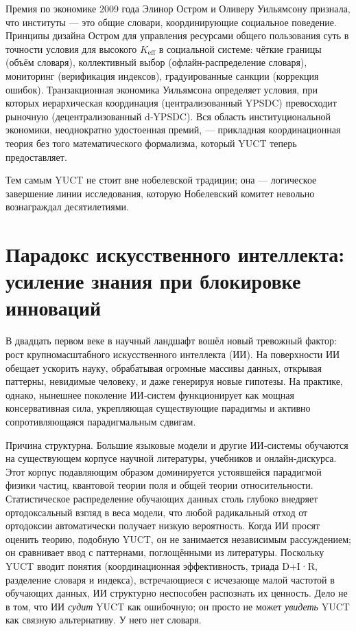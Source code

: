 \documentclass[12pt,a4paper]{article}
\begin{document}
	Премия по экономике 2009 года Элинор Остром и Оливеру Уильямсону признала, что институты — это общие словари, координирующие социальное поведение. Принципы дизайна Остром для управления ресурсами общего пользования суть в точности условия для высокого \(K_{\mathrm{eff}}\) в социальной системе: чёткие границы (объём словаря), коллективный выбор (офлайн-распределение словаря), мониторинг (верификация индексов), градуированные санкции (коррекция ошибок). Транзакционная экономика Уильямсона определяет условия, при которых иерархическая координация (централизованный YPSDC) превосходит рыночную (децентрализованный d‑YPSDC). Вся область институциональной экономики, неоднократно удостоенная премий, — прикладная координационная теория без того математического формализма, который YUCT теперь предоставляет.
	
	Тем самым YUCT не стоит вне нобелевской традиции; она — логическое завершение линии исследования, которую Нобелевский комитет невольно вознаграждал десятилетиями.
	
	\section{Парадокс искусственного интеллекта: усиление знания при блокировке инноваций}
	
	В двадцать первом веке в научный ландшафт вошёл новый тревожный фактор: рост крупномасштабного искусственного интеллекта (ИИ). На поверхности ИИ обещает ускорить науку, обрабатывая огромные массивы данных, открывая паттерны, невидимые человеку, и даже генерируя новые гипотезы. На практике, однако, нынешнее поколение ИИ‑систем функционирует как мощная консервативная сила, укрепляющая существующие парадигмы и активно сопротивляющаяся парадигмальным сдвигам.
	
	Причина структурна. Большие языковые модели и другие ИИ‑системы обучаются на существующем корпусе научной литературы, учебников и онлайн‑дискурса. Этот корпус подавляющим образом доминируется устоявшейся парадигмой физики частиц, квантовой теории поля и общей теории относительности. Статистическое распределение обучающих данных столь глубоко внедряет ортодоксальный взгляд в веса модели, что любой радикальный отход от ортодоксии автоматически получает низкую вероятность. Когда ИИ просят оценить теорию, подобную YUCT, он не занимается независимым рассуждением; он сравнивает ввод с паттернами, поглощёнными из литературы. Поскольку YUCT вводит понятия (координационная эффективность, триада D+I·R, разделение словаря и индекса), встречающиеся с исчезающе малой частотой в обучающих данных, ИИ структурно неспособен распознать их ценность. Дело не в том, что ИИ \emph{судит} YUCT как ошибочную; он просто не может \emph{увидеть} YUCT как связную альтернативу. У него нет словаря.
	
\end{document}
